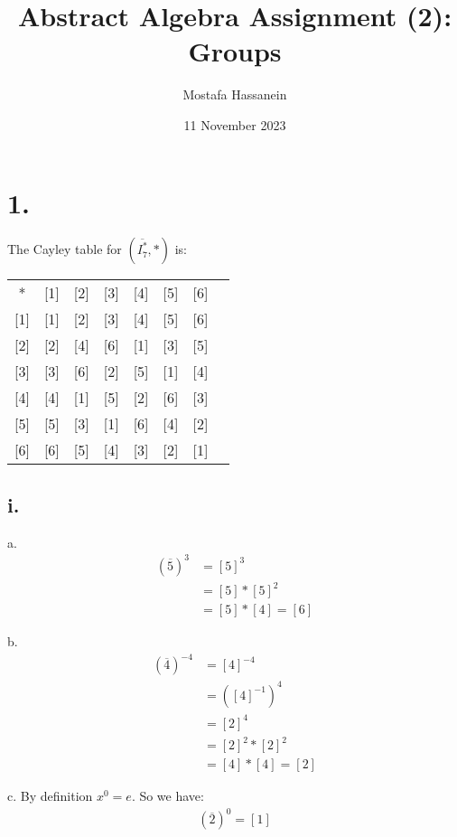 \documentclass{article}
\author{Mostafa Hassanein}
\title{Abstract Algebra Assignment (2): Groups}
\date{11 November 2023}
\begin{document}
\maketitle

\newpage

\section*{1.}

The Cayley table for $(\overline{I_7^*}, *)$ is:
\newline

\begin{tabular}{c | c c c c c c c}
  * & [1] & [2] & [3] & [4] & [5] & [6] \\
  \cline{1-7}
  {[1]} & [1] & [2] & [3] & [4] & [5] & [6] \\
  {[2]} & [2] & [4] & [6] & [1] & [3] & [5] \\
  {[3]} & [3] & [6] & [2] & [5] & [1] & [4] \\
  {[4]} & [4] & [1] & [5] & [2] & [6] & [3] \\
  {[5]} & [5] & [3] & [1] & [6] & [4] & [2] \\
  {[6]} & [6] & [5] & [4] & [3] & [2] & [1] \\
\end{tabular}

\subsection*{i.}
a.
\begin{align*}
  (\overline{5})^3 &= [5]^3 \\
                   &= [5] * [5]^2 \\
                   &= [5] * [4] = [6]
\end{align*}

\noindent
b. 
\begin{align*}
  (\overline{4})^{-4} &= [4]^{-4} \\
                   &= ([4]^{-1})^{4} \\
                   &= [2]^{4} \\
                   &= [2]^2 * [2]^2 \\
                   &= [4] * [4] = [2]
\end{align*}

\noindent
c. By definition $x^0 = e$. So we have:
\begin{align*}
  (\overline{2})^{0} = [1]
\end{align*}
\end{document}
